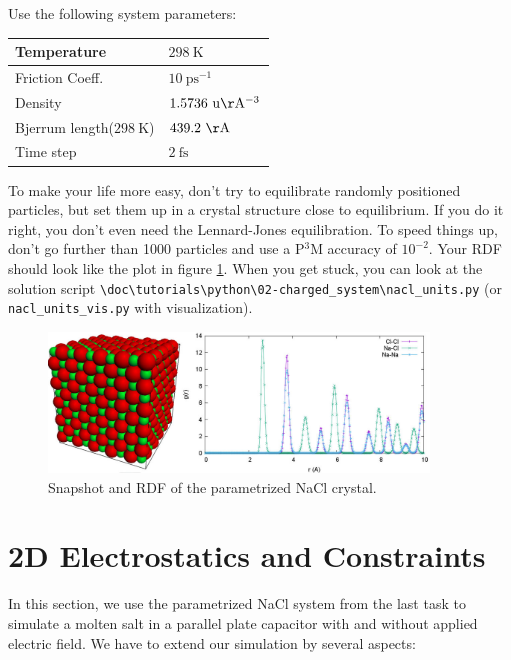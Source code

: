 \documentclass[
a4paper,                        %
11pt,                           %
twoside,                        %
footsepline,                    %
headsepline,                    %
headexclude,                    %
footexclude,                    %
pagesize,                       %
]{scrartcl}
\begin{document}
Use the following system parameters:

\begin{table}[h]
    \centering
    \begin{tabular}{l|l}
        Temperature            & $298 \ \mathrm{K}$          \\
        \hline
        Friction Coeff.        & $10 \ \mathrm{ps^{-1}}$      \\
        \hline
        Density                & $1.5736 \ \mathrm{u \AA^{-3}}$ \\
        \hline
        Bjerrum length($298 \ \mathrm{K}$) & $439.2 \ \mathrm{\AA}$      \\
        \hline
        Time step              & $2 \ \mathrm{fs}$
    \end{tabular}
\end{table}

To make your life more easy, don't try to equilibrate randomly positioned particles,
but set them up in a crystal structure close to equilibrium. If you do it right,
you don't even need the Lennard-Jones equilibration. 
To speed things up, don't go further than 1000 particles and use a P$^3$M accuracy of $10^{-2}$.
Your RDF should look like the plot in figure \ref{fig:nacl_units}. When you get stuck,
you can look at the solution script \verb|\doc\tutorials\python\02-charged_system\nacl_units.py| 
(or \verb|nacl_units_vis.py| with visualization).


\begin{figure}[h]
  \centering
  \includegraphics[width=0.9\textwidth]{figures/nacl_units}
  \caption{Snapshot and RDF of the parametrized NaCl crystal.}
  \label{fig:nacl_units}
\end{figure}

\section{2D Electrostatics and Constraints}

In this section, we use the parametrized NaCl system from the last task to simulate a molten salt in a
parallel plate capacitor with and without applied electric field. We have to extend our simulation by several aspects:
\end{document}
